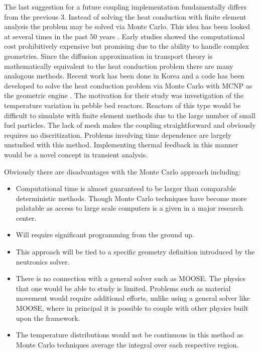\documentclass[11pt]{article}
\begin{document}
The last suggestion for a future coupling implementation  fundamentally differs from the previous 3.  Instead of solving the heat conduction  with finite element analysis the problem may be solved via Monte Carlo.  This idea has been looked at several times in the past 50 years\cite{fraley1980monte} \cite{hoffman1976monte} \cite{haji1967solution}.  Early studies showed the computational cost prohibitively  expensive but promising due to the ability to handle complex geometries.  Since the diffusion approximation in transport theory is mathematically equivalent to the heat conduction problem there are many analogous methods. Recent work has been done in Korea and a code has been developed to solve the heat conduction problem via Monte Carlo with MCNP as the geometric engine  \cite{song2007improved}.  The motivation for their study was investigation of the temperature variation in pebble bed reactors.  Reactors of this type would be difficult to simulate with finite element methods due to the large number of small fuel particles.  The lack of mesh makes the coupling straightforward and obviously requires no discritization. Problems involving time dependence are largely unstudied with this method.  Implementing thermal feedback in this manner would be a novel concept in transient analysis.

Obviously there are disadvantages with the Monte Carlo approach including:
	\begin{itemize}
	\item Computational time is almost guaranteed to be larger than comparable deterministic methods.  Though Monte Carlo techniques have become more palatable as access to large scale computers is a given in a major research center.
	\item Will  require significant programming from the ground up. 
	\item  This approach will be tied to a specific geometry definition introduced by the neutronics solver.  
	\item  There is no connection with a general solver such as MOOSE.  The physics that one would be able to study is limited.  Problems such as material movement would require additional efforts, unlike using a general solver like MOOSE, where in principal it is possible to couple with other physics built upon the framework.
	\item The temperature distributions would not be continuous in this method as Monte Carlo techniques average the integral over each respective region.
	\end{itemize}
\end{document}
